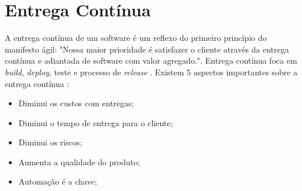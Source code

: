 \section{Entrega Contínua}

A entrega contínua de um software é um reflexo do primeiro princípio do manifesto ágil: "Nossa maior prioridade é satisfazer o cliente através da entrega contínua e adiantada de software com valor agregado."\cite{manifesto}. Entrega contínua foca em \textit{build}, \textit{deploy}, teste e processo de \textit{release} \cite{livro-deploy-continuo}.
Existem 5 aspectos importantes sobre a entrega contínua \cite{network-world}:
\begin{itemize}
    \item Diminui os custos com entregas;
    \item Diminui o tempo de entrega para o cliente;
    \item Diminui os riscos;
    \item Aumenta a qualidade do produto;
    \item Automação é a chave;
\end{itemize}
